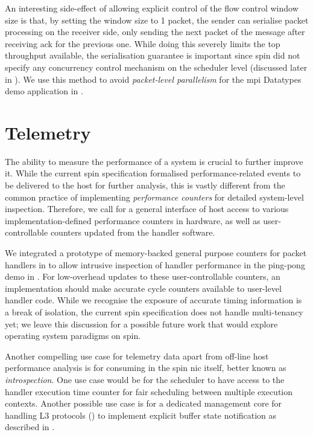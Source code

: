 An interesting side-effect of allowing explicit control of the flow control window size is that, by setting the window size to 1 packet, the sender can serialise packet processing on the receiver side, only sending the next packet of the message after receiving \ac{ack} for the previous one.  While doing this severely limits the top throughput available, the serialisation guarantee is important since \ac{spin} did not specify any concurrency control mechanism on the scheduler level (discussed later in ).  We use this method to avoid \emph{packet-level parallelism} for the \ac{mpi} Datatypes demo application in .

\section{Telemetry} \label{sec:telemetry-introspection}

The ability to measure the performance of a system is crucial to further improve it.  While the current \ac{spin} specification formalised performance-related events to be delivered to the host for further analysis, this is vastly different from the common practice of implementing \emph{performance counters} for detailed system-level inspection.  Therefore, we call for a general interface of host access to various implementation-defined performance counters in hardware, as well as user-controllable counters updated from the handler software.

We integrated a prototype of memory-backed general purpose counters for packet handlers in  to allow intrusive inspection of handler performance in the ping-pong demo in .  For low-overhead updates to these user-controllable counters, an implementation should make accurate cycle counters available to user-level handler code.  While we recognise the exposure of accurate timing information is a break of isolation, the current \ac{spin} specification does not handle multi-tenancy yet; we leave this discussion for a possible future work that would explore operating system paradigms on \ac{spin}.

Another compelling use case for telemetry data apart from off-line host performance analysis is for consuming in the \ac{spin} \ac{nic} itself, better known as \emph{introspection}.  One use case would be for the scheduler to have access to the handler execution time counter for fair scheduling between multiple execution contexts.  Another possible use case is for a dedicated management core for handling L3 protocols () to implement explicit buffer state notification as described in .

